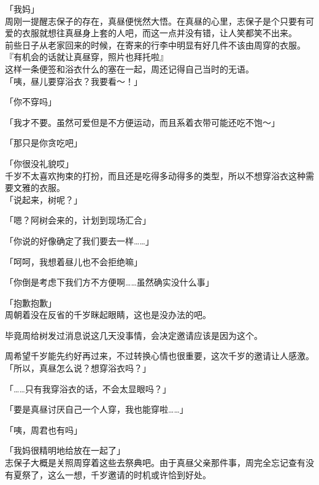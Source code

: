 「我妈」\\

周刚一提醒志保子的存在，真昼便恍然大悟。在真昼的心里，志保子是个只要有可爱的衣服就想往真昼身上套的人吧，而这一点并没有错，让人笑都笑不出来。\\

前些日子从老家回来的时候，在寄来的行李中明显有好几件不该由周穿的衣服。\\

『有机会的话就让真昼穿，照片也拜托啦』\\

这样一条便签和浴衣什么的塞在一起，周还记得自己当时的无语。\\

「咦，昼儿要穿浴衣？我要看～！」

「你不穿吗」

「我才不要。虽然可爱但是不方便运动，而且系着衣带可能还吃不饱～」

「那只是你贪吃吧」

「你很没礼貌哎」\\

千岁不太喜欢拘束的打扮，而且还是吃得多动得多的类型，所以不想穿浴衣这种需要文雅的衣服。\\

「说起来，树呢？」

「嗯？阿树会来的，计划到现场汇合」

「你说的好像确定了我们要去一样……」

「呵呵，我想着昼儿也不会拒绝嘛」

「你倒是考虑下我们方不方便啊……虽然确实没什么事」

「抱歉抱歉」\\

周朝着没在反省的千岁眯起眼睛，这也是没办法的吧。

毕竟周给树发过消息说这几天没事情，会决定邀请应该是因为这个。

周希望千岁能先约好再过来，不过转换心情也很重要，这次千岁的邀请让人感激。\\

「所以，真昼怎么说？想穿浴衣吗？」

「……只有我穿浴衣的话，不会太显眼吗？」

「要是真昼讨厌自己一个人穿，我也能穿啦……」

「咦，周君也有吗」

「我妈很精明地给放在一起了」\\

志保子大概是关照周穿着这些去祭典吧。由于真昼父亲那件事，周完全忘记查有没有夏祭了，这么一想，千岁邀请的时机或许恰到好处。\\

